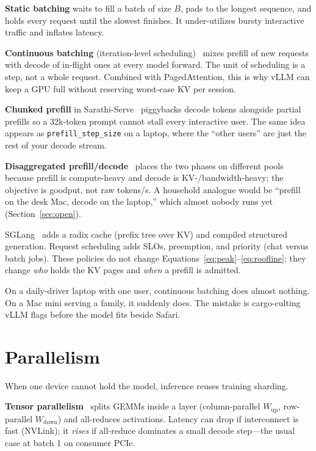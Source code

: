 \textbf{Static batching} waits to fill a batch of size \(B\), pads to the longest sequence, and holds every request until the slowest finishes. It under-utilizes bursty interactive traffic and inflates latency.

\textbf{Continuous batching} (iteration-level scheduling)~\citep{yu2022orca,kwon2023vllm} mixes prefill of new requests with decode of in-flight ones at every model forward. The unit of scheduling is a step, not a whole request. Combined with PagedAttention, this is why vLLM can keep a GPU full without reserving worst-case KV per session.

\textbf{Chunked prefill} in Sarathi-Serve~\citep{agrawal2024sarathi} piggybacks decode tokens alongside partial prefills so a 32k-token prompt cannot stall every interactive user. The same idea appears as \texttt{prefill\_step\_size} on a laptop, where the ``other users'' are just the rest of your decode stream.

\textbf{Disaggregated prefill/decode}~\citep{patel2024splitwise,aminabadi2024distserve} places the two phases on different pools because prefill is compute-heavy and decode is KV-/bandwidth-heavy; the objective is goodput, not raw tokens/s. A household analogue would be ``prefill on the desk Mac, decode on the laptop,'' which almost nobody runs yet (Section~\ref{sec:open}).

SGLang~\citep{zheng2024sglang} adds a radix cache (prefix tree over KV) and compiled structured generation. Request scheduling adds SLOs, preemption, and priority (chat versus batch jobs). These policies do not change Equations~\eqref{eq:peak}--\eqref{eq:roofline}; they change \emph{who} holds the KV pages and \emph{when} a prefill is admitted.

On a daily-driver laptop with one user, continuous batching does almost nothing. On a Mac mini serving a family, it suddenly does. The mistake is cargo-culting vLLM flags before the model fits beside Safari.

\section{Parallelism}
\label{sec:parallel}

When one device cannot hold the model, inference reuses training sharding.

\textbf{Tensor parallelism}~\citep{shoeybi2019megatron,narayanan2021efficient} splits GEMMs inside a layer (column-parallel \(W_{\mathrm{up}}\), row-parallel \(W_{\mathrm{down}}\)) and all-reduces activations. Latency can drop if interconnect is fast (NVLink); it \emph{rises} if all-reduce dominates a small decode step---the usual case at batch 1 on consumer PCIe.

